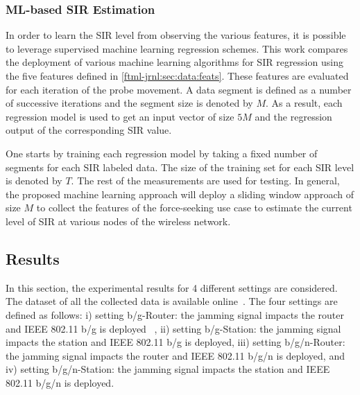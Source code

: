 \subsubsection{ML-based SIR Estimation}\label{ftml-jrnl:sec:data:ML}
In order to learn the SIR level from observing the various features, it is possible to leverage supervised machine learning regression schemes. 
This work compares the deployment of various machine learning algorithms for SIR regression using the five features defined in \ref{ftml-jrnl:sec:data:feats}. These features are evaluated for each iteration of the probe movement. A data segment is defined as a number of successive iterations and the segment size is denoted by $M$. As a result, each regression model is used to get an input vector of size $5M$ and the regression output of the corresponding SIR value. 

One starts by training each regression model by taking a fixed number of segments for each SIR labeled data. The size of the training set for each SIR level is denoted by $T$. The rest of the measurements are used for testing. In general, the proposed machine learning approach will deploy a sliding window approach of size $M$ to collect the features of the force-seeking use case to estimate the current level of SIR at various nodes of the wireless network. 

\subsection{Results} \label{ftml-jrnl:sec:results}  
In this section, the experimental results for 4 different settings are considered. The dataset of all the collected data is available online~\cite{https://doi.org/10.18434/m32077}. The four settings are defined as follows: i) setting b/g-Router: the jamming signal impacts the router and IEEE 802.11 b/g is deployed ~\cite{IEEE802.11ac}, ii) setting b/g-Station: the jamming signal impacts the station and IEEE 802.11 b/g is deployed, iii) setting b/g/n-Router: the jamming signal impacts the router and IEEE 802.11 b/g/n is deployed, and iv) setting b/g/n-Station: the jamming signal impacts the station and IEEE 802.11 b/g/n is deployed.  

